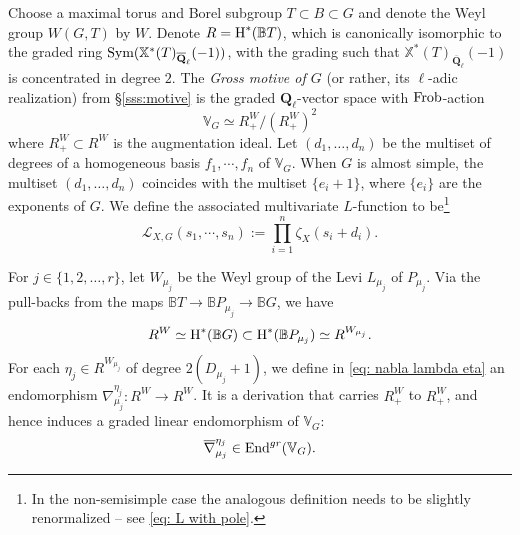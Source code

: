 \documentclass[reqno]{amsart}
\numberwithin{equation}{subsection}
\theoremstyle{definition}
\def\BB{\mathbb{B}}
\def\VV{\mathbb{V}}
\def\ZZ{\mathbb{Z}}
\newcommand{\sL}{{\mathscr{L}}}
\newcommand\Frob{\textup{Frob}}
\newcommand\Sym{\textup{Sym}}
\newcommand\End{\textup{End}}
\newcommand\xch{\mathbb{X}^*}
\newcommand{\Ql}{\Q_{\ell}}
\newcommand{\Qlbar}{\overline{\Q}_\ell}
\newcommand{\ov}{\overline}
\newcommand{\cohog}[2]{\textup{H}^{#1}({#2})}     %
\newcommand{\y}{\eta}
\newcommand{\z}{\zeta}
\newcommand\nb{\nabla}
\newcommand{\Q}{\mathbf{Q}}
\begin{document}
 
Choose a  maximal torus and Borel subgroup $T\subset B\subset G$ and denote the Weyl group $W(G,T)$ by $W$.
Denote $R=\cohog{*}{\BB T}$, which is canonically isomorphic to the graded ring $\Sym(\xch(T)_{\Qlbar}(-1))$, with the grading such that $\xch(T)_{\Qlbar}(-1)$ is concentrated in degree $2$. The {\em Gross motive of $G$} (or rather, its $\ell$-adic realization) from \S\ref{sss:motive} is the graded $\Ql$-vector space with $\Frob$-action
\begin{equation}
    \VV_G\simeq R^{W}_+/(R^{W}_+)^2
\end{equation}
where $R^{W}_+ \subset R^W$ is the augmentation ideal. Let $(d_1, \ldots, d_n)$ be the multiset of degrees of a homogeneous basis $f_1,\cdots, f_n$ of $\VV_G$. When $G$ is almost simple, the multiset $(d_1, \ldots, d_n)$ coincides with the multiset $\{e_{i}+1\}$, where $\{e_{i}\}$ are the exponents of $G$. We define the associated multivariate $L$-function to be\footnote{In the non-semisimple case the analogous definition needs to be slightly renormalized -- see \eqref{eq: L with pole}.}
\begin{equation*}
\sL_{X, G}(s_{1},\cdots, s_{n}) :=\prod_{i=1}^n \z_{X}(s_{i}+d_{i}).
\end{equation*}
 




For $j \in \{1, 2, \ldots, r\}$, let $W_{\mu_j}$ be the Weyl group of the Levi $L_{\mu_j}$ of $P_{\mu_j}$. Via the pull-backs from the maps $\BB T\to\BB P_{\mu_j} \to\BB G$, we have
 $$
 R^{W} \simeq \cohog{*}{\BB G} \subset \cohog{*}{\BB P_{\mu_j}}\simeq R^{W_{\mu_j}}.
$$
For each $\y_j\in R^{W_{\mu_j}}$ of degree $2(D_{\mu_j}+1)$, we define in \eqref{eq: nabla lambda eta}
an endomorphism $\nb^{\y_j}_{\mu_j}: R^W\to R^W$. It is a derivation that carries $R^{W}_{+}$ to $R^{W}_{+}$, and hence induces a graded  linear endomorphism of $\VV_G$:
\begin{equation*}
\ov\nb^{\y_j}_{\mu_j}\in \End^{gr}(\VV_G).
\end{equation*}
\end{document}
